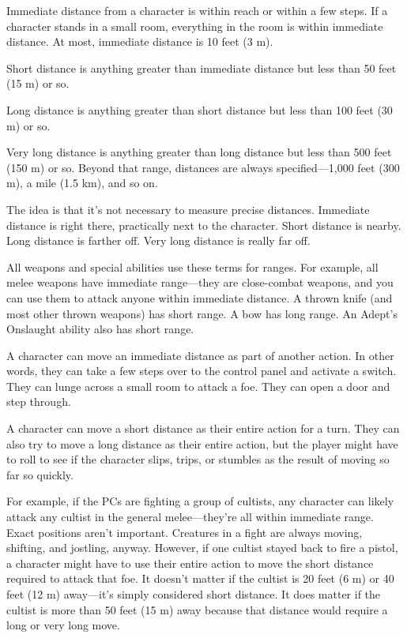 \begin{multicols}{2}
Immediate distance from a character is within reach or within a few steps. If a character stands in a small room, everything in the room is within immediate distance. At most, immediate distance is 10 feet (3 m).

Short distance is anything greater than immediate distance but less than 50 feet (15 m) or so. 

Long distance is anything greater than short distance but less than 100 feet (30 m) or so. 

Very long distance is anything greater than long distance but less than 500 feet (150 m) or so. Beyond that range, distances are always specified—1,000 feet (300 m), a mile (1.5 km), and so on.

The idea is that it’s not necessary to measure precise distances. Immediate distance is right there, practically next to the character. Short distance is nearby. Long distance is farther off. Very long distance is really far off.

All weapons and special abilities use these terms for ranges. For example, all melee weapons have immediate range—they are close-combat weapons, and you can use them to attack anyone within immediate distance. A thrown knife (and most other thrown weapons) has short range. A bow has long range. An Adept’s Onslaught ability also has short range.

A character can move an immediate distance as part of another action. In other words, they can take a few steps over to the control panel and activate a switch. They can lunge across a small room to attack a foe. They can open a door and step through.

A character can move a short distance as their entire action for a turn. They can also try to move a long distance as their entire action, but the player might have to roll to see if the character slips, trips, or stumbles as the result of moving so far so quickly.

For example, if the PCs are fighting a group of cultists, any character can likely attack any cultist in the general melee—they’re all within immediate range. Exact positions aren’t important. Creatures in a fight are always moving, shifting, and jostling, anyway. However, if one cultist stayed back to fire a pistol, a character might have to use their entire action to move the short distance required to attack that foe. It doesn’t matter if the cultist is 20 feet (6 m) or 40 feet (12 m) away—it’s simply considered short distance. It does matter if the cultist is more than 50 feet (15 m) away because that distance would require a long or very long move.


\end{multicols}
